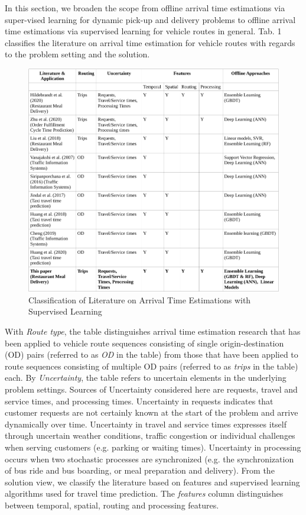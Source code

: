 In this section, we broaden the scope from offline arrival time estimations via super-vised learning for dynamic pick-up and delivery problems to offline arrival time estimations via supervised learning for vehicle routes in general.
Tab. 1 classifies the literature on arrival time estimation for vehicle routes with regards to the problem setting and the solution.
\begin{figure}
	\centering
	\includegraphics[width=\linewidth]{figures/LiteratureClassification.pdf}
	\caption{Classification of Literature on Arrival Time Estimations with Supervised Learning}
	\label{fig:literatureTable}
\end{figure}
With \textit{Route type}, the table distinguishes arrival time estimation research that has been applied to vehicle route sequences consisting of single origin-destination (OD) pairs (referred to as \textit{OD} in the table) from those that have been applied to route sequences consisting of multiple OD pairs (referred to as \textit{trips} in the table) each.
By \textit{Uncertainty}, the table refers to uncertain elements in the underlying problem settings. Sources of Uncertainty considered here are requests, travel and service times, and processing times. Uncertainty in requests indicates that customer requests are not certainly known at the start of the problem and arrive dynamically over time. Uncertainty in travel and service times expresses itself through uncertain weather conditions, traffic congestion or individual challenges when serving customers (e.g. parking or waiting times). Uncertainty in processing occurs when two stochastic processes are synchronized (e.g. the synchronization of bus ride and bus boarding, or meal preparation and delivery). From the solution view, we classify the literature based on features and supervised learning algorithms used for travel time prediction. The \textit{features} column distinguishes between temporal, spatial, routing and processing features.
